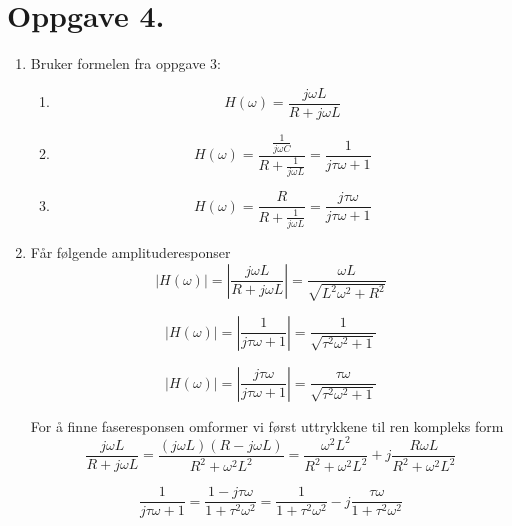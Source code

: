 \documentclass[a4paper,11pt,norsk]{article}
\begin{document}
\section*{Oppgave 4.}
\begin{enumerate}
    \item Bruker formelen fra oppgave 3:
        \begin{enumerate}[label=\Roman*)]
            \item 
                \[
                    H(\omega) = \frac{j \omega L}{R + j \omega L}
                \]
            \item 
                \[
                    H(\omega) = \frac{\frac{1}{j \omega C}}{R + \frac{1}{j \omega L}} = \frac{1}{j\tau\omega + 1}
                \]
            \item 
                \[
                    H(\omega) = \frac{R}{R + \frac{1}{j \omega L}} = \frac{j\tau\omega}{j\tau\omega + 1}
                \]
        \end{enumerate}
    \item Får følgende amplituderesponser
        \begin{equation}
            \left|H(\omega)\right| = \left|\frac{j \omega L}{R + j \omega L}\right| = \frac{\omega L}{\sqrt{L^2\omega^2 + R^2}}
        \end{equation}

        \begin{equation}
            \left|H(\omega)\right| = \left|\frac{1}{j\tau\omega + 1}\right| = \frac{1}{\sqrt{\tau^2\omega^2 + 1}}
        \end{equation}

        \begin{equation}
            \left|H(\omega)\right| = \left|\frac{j\tau\omega}{j\tau\omega + 1}\right| = \frac{\tau\omega}{\sqrt{\tau^2\omega^2 + 1}}
        \end{equation}

        \setcounter{equation}{0} 
        For å finne faseresponsen omformer vi først uttrykkene til ren kompleks form
        \begin{equation}
            \frac{j\omega L}{R + j\omega L} = \frac{(j\omega L)(R - j\omega L)}{R^2 + \omega^2L^2} = \frac{\omega^2L^2}{R^2+\omega^2L^2} + j\frac{R\omega L}{R^2 + \omega^2L^2}
        \end{equation}

        \begin{equation}
            \frac{1}{j\tau\omega + 1} = \frac{1-j\tau\omega}{1 + \tau^2\omega^2} = \frac{1}{1 + \tau^2\omega^2} - j\frac{\tau\omega}{1 + \tau^2\omega^2} 
        \end{equation}


\end{enumerate}
\end{document}
